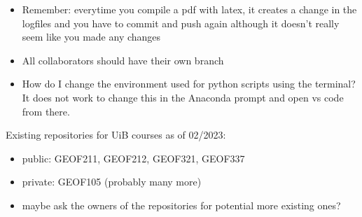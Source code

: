 \documentclass{article}
\begin{document}
    \begin{itemize}
        \item Remember: everytime you compile a pdf with latex, it creates a 
        change in the logfiles and you have to commit and push again although 
        it doesn't really seem like you made any changes
        \item All collaborators should have their own branch
        \item How do I change the environment used for python scripts using 
        the terminal? It does not work to change this in the Anaconda prompt 
        and open vs code from there. 
    \end{itemize}

Existing repositories for UiB courses as of 02/2023:
\begin{itemize}
    \item public: GEOF211, GEOF212, GEOF321, GEOF337
    \item private: GEOF105 (probably many more)
    \item maybe ask the owners of the repositories for potential more existing ones?
\end{itemize}
\end{document}
